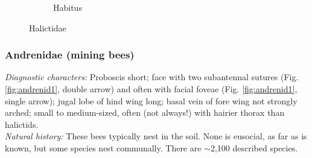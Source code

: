 \documentclass[letterpaper, 11pt]{article}
\begin{document}
\begin{figure}[ht!]
\begin{subfigure}[ht!]{0.4\textwidth}
        \caption{Habitus \citep[][Fig. 118]{goulet1993hymenoptera}}
        \label{fig:halict2}
    \end{subfigure}
    \caption{Halictidae}\label{fig:halictidae}
\end{figure}

\subsubsection{Andrenidae (mining bees)}
\noindent{}\textit{Diagnostic characters:} Proboscis short; face with two subantennal sutures (Fig. \ref{fig:andrenid1}, double arrow) and often with facial foveae (Fig. \ref{fig:andrenid1}, single arrow); jugal lobe of hind wing long; basal vein of fore wing not strongly arched; small to medium-sized, often (not always!) with hairier thorax than halictids.\\

\noindent{}\textit{Natural history:} These bees typically nest in the soil. None is eusocial, as far as is known, but some species nest communally. There are $\sim$2,100 described species.\\
\end{document}
